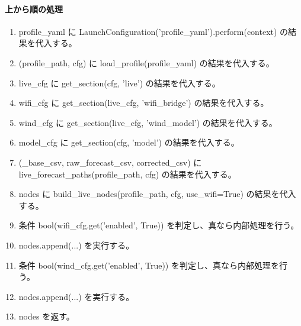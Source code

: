 \documentclass[a4paper,11pt]{article}
\begin{document}
            \paragraph{上から順の処理}
            \begin{enumerate}[leftmargin=1.8em]
            \item profile\_yaml に LaunchConfiguration('profile\_yaml').perform(context) の結果を代入する。
\item (profile\_path, cfg) に load\_profile(profile\_yaml) の結果を代入する。
\item live\_cfg に get\_section(cfg, 'live') の結果を代入する。
\item wifi\_cfg に get\_section(live\_cfg, 'wifi\_bridge') の結果を代入する。
\item wind\_cfg に get\_section(live\_cfg, 'wind\_model') の結果を代入する。
\item model\_cfg に get\_section(cfg, 'model') の結果を代入する。
\item (\_base\_csv, raw\_forecast\_csv, corrected\_csv) に live\_forecast\_paths(profile\_path, cfg) の結果を代入する。
\item nodes に build\_live\_nodes(profile\_path, cfg, use\_wifi=True) の結果を代入する。
\item 条件 bool(wifi\_cfg.get('enabled', True)) を判定し、真なら内部処理を行う。
\item   nodes.append(...) を実行する。
\item 条件 bool(wind\_cfg.get('enabled', True)) を判定し、真なら内部処理を行う。
\item   nodes.append(...) を実行する。
\item nodes を返す。
            \end{enumerate}
\end{document}
